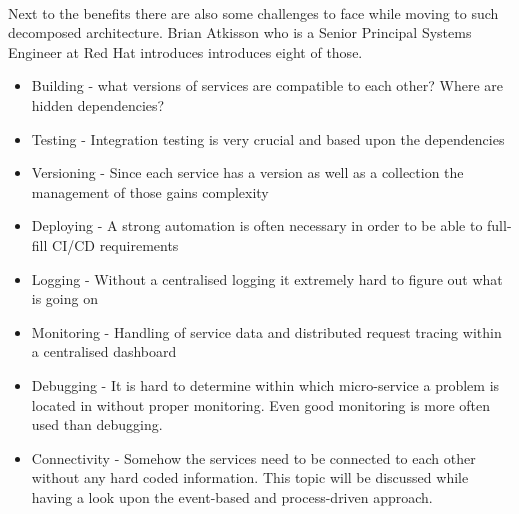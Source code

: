 \\
Next to the benefits there are also some challenges to face while moving to such decomposed architecture. Brian Atkisson who is a Senior Principal Systems Engineer at Red Hat introduces introduces eight of those. 
\begin{itemize}
    \item Building - what versions of services are compatible to each other? Where are hidden dependencies?
    \item Testing - Integration testing is very crucial and based upon the dependencies 
    \item Versioning - Since each service has a version as well as a collection the management of those gains complexity
    \item Deploying - A strong automation is often necessary in order to be able to full-fill CI/CD requirements
    \item Logging - Without a centralised logging it extremely hard to figure out what is going on
    \item Monitoring - Handling of service data and distributed request tracing within a centralised dashboard
    \item Debugging - It is hard to determine within which micro-service a problem is located in without proper monitoring. Even good monitoring is more often used than debugging.
    \item Connectivity - Somehow the services need to be connected to each other without any hard coded information. This topic will be discussed while having a look upon the event-based and process-driven approach. 
\end{itemize}
\cite{ChallengesMicroservices}

